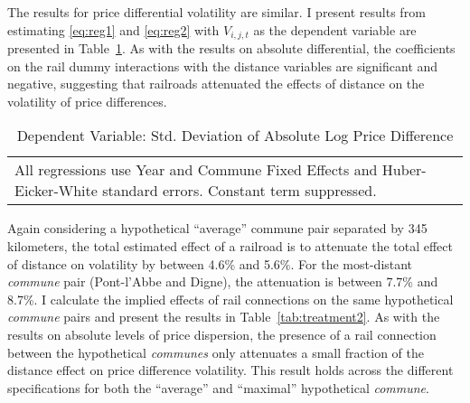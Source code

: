 \documentclass[12pt,twoside]{article}
\begin{document}
The results for price differential volatility are similar.
I present results from estimating \eqref{eq:reg1} and \eqref{eq:reg2} with $V_{i,j,t}$ as the dependent variable are presented in Table~\ref{tab:reg2}.
As with the results on absolute differential, the coefficients on the rail dummy interactions with the distance variables are significant and negative, suggesting that railroads attenuated the effects of distance on the volatility of price differences.

\begin{table}[htbp]\centering
\def\sym#1{\ifmmode^{#1}\else\(^{#1}\)\fi}
\caption{Dependent Variable: Std. Deviation of Absolute Log Price Difference\label{tab:reg2}}
	\begin{tabular}{l*{4}{c}}
	\toprule
	
	\bottomrule
	\multicolumn{5}{l}{\footnotesize {\parbox[t]{14cm}{All regressions use Year and Commune Fixed Effects and Huber-Eicker-White standard errors. Constant term suppressed.}}}\\
	\end{tabular}
\end{table}

Again considering a hypothetical ``average'' commune pair separated by 345 kilometers, the total estimated effect of a railroad is to attenuate the total effect of distance on volatility by between 4.6\% and 5.6\%.
For the most-distant \emph{commune} pair (Pont-l'Abbe and Digne), the attenuation is between 7.7\% and 8.7\%.
I calculate the implied effects of rail connections on the same hypothetical \emph{commune} pairs and present the results in Table~\ref{tab:treatment2}.
As with the results on absolute levels of price dispersion, the presence of a rail connection between the hypothetical \emph{communes} only attenuates a small fraction of the distance effect on price difference volatility.
This result holds across the different specifications for both the ``average'' and ``maximal'' hypothetical \emph{commune}.
\end{document}
